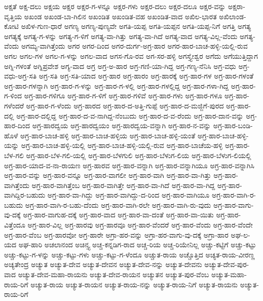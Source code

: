 ಅಕ್ಷತೆ
ಅಕ್ಷ-ದಲು
ಅಕ್ಷಯ
ಅಕ್ಷರ
ಅಕ್ಷರ-ಗ-ಳನ್ನೂ
ಅಕ್ಷರ-ಗಳು
ಅಕ್ಷರ-ದಲು
ಅಕ್ಷರ-ದಲೂ
ಅಕ್ಷರ-ವನ್ನು
ಅಕ್ಷರಾ-ವೃತ್ತಿಯ
ಅಖಂಡ
ಅಖಂಡ-ಬಾ-ಗಿಲಿನ
ಅಖಂಡಿತ
ಅಖಂಡಿತ-ವಹ
ಅಖಂಡಿತ-ವಾದ
ಅಖಿಲ-ಭಾರತ
ಅಖಿಲಾಂಡ-ಕೋಟಿ
ಅಖಿಳ-ಗುಣ-ಧಾರೆ
ಅಗಣ್ಯ
ಅಗಣ್ಯ-ಪುಣ್ಯವೇ
ಅಗತಿ-ಯಪ್ಪ
ಅಗತಿ-ಯಪ್ಪನ
ಅಗತಿ-ಯಪ್ಪ-ನಿಗೆ
ಅಗತ್ತಿ
ಅಗತ್ಯ
ಅಗತ್ಯಕ್ಕೆ
ಅಗತ್ಯ-ಗ-ಳನ್ನು
ಅಗತ್ಯ-ಗ-ಳಿಗೆ
ಅಗತ್ಯ-ವಾ-ಗಿತ್ತು
ಅಗತ್ಯ-ವಾ-ಗಿದೆ
ಅಗತ್ಯ-ವಾದ
ಅಗತ್ಯ-ವಿಲ್ಲ-ವೆಂದು
ಅಗತ್ಯ-ವೆಂದು
ಅಗಮ್ಯ-ವಾಗಿತ್ತೆಂದು
ಅಗರ
ಅಗರ-ದಿಂದ
ಅಗರ-ದುರ್ಗ-ಅಗ್ರ-ಹಾರ
ಅಗರ-ಹಾರ-ಬಾಚ-ಹಳ್ಳಿ-ಯಲ್ಲಿ-ರುವ
ಅಗಲ
ಅಗಲ-ಗಳ
ಅಗಲ-ಗ-ಳನ್ನು
ಅಗಲ-ವಾದ
ಅಗಸ-ಗೊ-ರವ
ಅಗ-ಸರ-ಹಳ್ಳಿ
ಅಗಸ್ತ್ಯೇಶ್ವರ
ಅಗೆದು
ಅಗೆಯುತ್ತಿದ್ದಾಗ
ಅಗ್ನಿ-ಗಳಂತೆ
ಅಗ್ನಿಪ್ರವೇಶ
ಅಗ್ಯ-ವಾದ
ಅಗ್ರ
ಅಗ್ರ-ಅ-ಹಾರ
ಅಗ್ರ-ಗಣಿ-ಯಾ-ಗಿದ್ದ
ಅಗ್ರ-ಗಣ್ಯ-ನೆನಿಸಿ
ಅಗ್ರ-ವಧು
ಅಗ್ರ-ವಧು-ಅಗ್ರ-ಸತಿ
ಅಗ್ರ-ಸತಿ
ಅಗ್ರ-ಸತಿ-ಯಾದ
ಅಗ್ರ-ಹಾರ
ಅಗ್ರ-ಹಾರಂ
ಅಗ್ರ-ಹಾರಕ್ಕೆ
ಅಗ್ರ-ಹಾರ-ಗಳ
ಅಗ್ರ-ಹಾರ-ಗಳಂತೆ
ಅಗ್ರ-ಹಾರ-ಗಳನ್ನಾಗಿ
ಅಗ್ರ-ಹಾರ-ಗ-ಳನ್ನು
ಅಗ್ರ-ಹಾರ-ಗ-ಳಲ್ಲಿ
ಅಗ್ರ-ಹಾರ-ಗಳಲ್ಲಿದ್ದ
ಅಗ್ರ-ಹಾರ-ಗಳಾ-ಗಿದ್ದ
ಅಗ್ರ-ಹಾರ-ಗ-ಳಿಂದ
ಅಗ್ರ-ಹಾರ-ಗಳಿಗೂ
ಅಗ್ರ-ಹಾರ-ಗ-ಳಿಗೆ
ಅಗ್ರ-ಹಾರ-ಗಳಿವೆ
ಅಗ್ರ-ಹಾರ-ಗಳು
ಅಗ್ರ-ಹಾರ-ಗಳೂ
ಅಗ್ರ-ಹಾರ-ಗಳೆಂದರೆ
ಅಗ್ರ-ಹಾರ-ಗ-ಳೆಂದು
ಅಗ್ರ-ಹಾರದ
ಅಗ್ರ-ಹಾರ-ದ-ಅತ್ತಿ-ಗುಪ್ಪೆ
ಅಗ್ರ-ಹಾರ-ದ-ಮಜ್ಜಿಗೆ-ಪುರದ
ಅಗ್ರ-ಹಾರ-ದಲ್ಲಿ
ಅಗ್ರ-ಹಾರ-ದಲ್ಲಿದ್ದ
ಅಗ್ರ-ಹಾರ-ದ-ವ-ನಾಗಿದ್ದ-ನೆಂಬುದು
ಅಗ್ರ-ಹಾರ-ದ-ವ-ರೆಂದು
ಅಗ್ರ-ಹಾರ-ದಾನ-ವನ್ನು
ಅಗ್ರ-ಹಾರ-ದಿಂದ
ಅಗ್ರ-ಹಾರದ್ವಯ
ಅಗ್ರ-ಹಾರದ್ವಯಂ
ಅಗ್ರ-ಹಾರದ್ವಯ-ವನ್ನಾಗಿ
ಅಗ್ರ-ಹಾರ-ನ-ವನ್ನು
ಅಗ್ರ-ಹಾರ-ಬಂಡಿ-ಹೊಳೆ
ಅಗ್ರ-ಹಾರ-ಬಾಚ-ಹಳ್ಳಿ
ಅಗ್ರ-ಹಾರ-ಬಾಚ-ಹಳ್ಳಿಯ
ಅಗ್ರ-ಹಾರ-ಬಾಚ-ಹಳ್ಳಿ-ಯಂತೆ
ಅಗ್ರ-ಹಾರ-ಬಾಚ-ಹಳ್ಳಿ-ಯನ್ನು
ಅಗ್ರ-ಹಾರ-ಬಾಚ-ಹಳ್ಳಿ-ಯಲ್ಲಿ
ಅಗ್ರ-ಹಾರ-ಬಾಚ-ಹಳ್ಳಿ-ಯಲ್ಲಿ-ರುವ
ಅಗ್ರ-ಹಾರ-ಬಾಚೆಯ-ಹಳ್ಳಿ
ಅಗ್ರ-ಹಾರ-ಬೆಳ-ಗಲಿ
ಅಗ್ರ-ಹಾರ-ಬೆಳ-ಗಲಿ-ಯಲ್ಲಿ
ಅಗ್ರ-ಹಾರ-ಬೆಳಗುಲಿ
ಅಗ್ರ-ಹಾರ-ಬೆಳುಗ-ಲಿಯ
ಅಗ್ರ-ಹಾರ-ಬೆಳುಗ-ಲಿಯಲ್ಲಿ
ಅಗ್ರ-ಹಾರ-ಯಾದ-ವ-ನಾ-ರಾಯಣ
ಅಗ್ರ-ಹಾರವ
ಅಗ್ರ-ಹಾರ-ವನ್ನಾಗಿ
ಅಗ್ರ-ಹಾರ-ವನ್ನಾಗಿಯೂ
ಅಗ್ರ-ಹಾರ-ವನ್ನಾಗಿಸಿ
ಅಗ್ರ-ಹಾರ-ವನ್ನು
ಅಗ್ರ-ಹಾರ-ವನ್ನೂ
ಅಗ್ರ-ಹಾರ-ವಾಗಲೀ
ಅಗ್ರ-ಹಾರ-ವಾಗಿ
ಅಗ್ರ-ಹಾರ-ವಾ-ಗಿತ್ತು
ಅಗ್ರ-ಹಾರ-ವಾಗಿತ್ತೆಂದು
ಅಗ್ರ-ಹಾರ-ವಾಗಿತ್ತೆಂಬ
ಅಗ್ರ-ಹಾರ-ವಾಗಿತ್ತೇ
ಅಗ್ರ-ಹಾರ-ವಾ-ಗಿದೆ
ಅಗ್ರ-ಹಾರ-ವಾ-ಗಿದ್ದ
ಅಗ್ರ-ಹಾರ-ವಾಗಿದ್ದಿರ-ಬಹುದು
ಅಗ್ರ-ಹಾರ-ವಾ-ಗಿದ್ದು
ಅಗ್ರ-ಹಾರ-ವಾಗಿದ್ದು-ದ-ರಿಂದ
ಅಗ್ರ-ಹಾರ-ವಾಗಿಯೂ
ಅಗ್ರ-ಹಾರ-ವಾಗಿ-ರ-ಬಹುದು
ಅಗ್ರ-ಹಾರ-ವಾಗಿ-ರ-ಬಹು-ದೆಂದು
ಅಗ್ರ-ಹಾರ-ವಾಗಿ-ರಲೇ
ಅಗ್ರ-ಹಾರ-ವಾಗಿ-ರು-ವುದು
ಅಗ್ರ-ಹಾರ-ವಾಗು-ವು-ದಕ್ಕೆ
ಅಗ್ರ-ಹಾರ-ವಾಗುಹ-ದಕ್ಕೆ
ಅಗ್ರ-ಹಾರ-ವಾದ
ಅಗ್ರ-ಹಾರ-ವಾ-ದಂತೆ
ಅಗ್ರ-ಹಾರ-ವಾ-ಯಿತು
ಅಗ್ರ-ಹಾರ-ವಿತ್ತೆಂದೂ
ಅಗ್ರ-ಹಾರ-ವಿಲ್ಲ
ಅಗ್ರ-ಹಾರವು
ಅಗ್ರ-ಹಾರವೂ
ಅಗ್ರ-ಹಾರ-ವೆಂದರೆ
ಅಗ್ರ-ಹಾರ-ವೆಂದು
ಅಗ್ರ-ಹಾರ-ವೆಂದೇ
ಅಗ್ರ-ಹಾರ-ವೆಂಬ
ಅಗ್ರ-ಹಾರವೋ
ಅಗ್ರ-ಹಾರೇ
ಅಗ್ರಾ-ಹರ-ವನ್ನು
ಅಗ್ರಾ-ಹರ-ವಾಗು-ವು-ದಕ್ಕೆ
ಅಗ್ರಾ-ಹಾರ
ಅಘ-ಲ-ಯದ
ಅಘ-ಹಾರಿ
ಅಚಲಾನಂದ
ಅಚಿನ್ತ್ಯ
ಅಚ್ಚ-ಕನ್ನಡಿಗ-ರಾದ
ಅಚ್ಚ-ರಿಯ
ಅಚ್ಚ-ರಿಯೇನಿಲ್ಲ
ಅಚ್ಚು-ಕಟ್ಟಿಗೆ
ಅಚ್ಚು-ಕಟ್ಟು
ಅಚ್ಚು-ಕಟ್ಟು-ಗ-ಳನ್ನು
ಅಚ್ಚು-ಕಟ್ಟು-ಗಳು
ಅಚ್ಚು-ಕಟ್ಟು-ಗ-ಳೆಂದೂ
ಅಚ್ಚುತ-ರಾಯ
ಅಚ್ಚೊತ್ತಿದ
ಅಚ್ಯತ-ರಾಯ-ವೀರಣ್ಣ
ಅಚ್ಯತೇಂದ್ರ
ಅಚ್ಯುತ
ಅಚ್ಯುತ-ದೇವ
ಅಚ್ಯುತ-ದೇವನ
ಅಚ್ಯುತ-ದೇವ-ನನ್ನು
ಅಚ್ಯುತ-ದೇವನು
ಅಚ್ಯುತ-ದೇವ-ಪುರ-ವಾದ
ಅಚ್ಯುತ-ದೇವ-ಮಹಾ-ರಾಯನು
ಅಚ್ಯುತ-ದೇವ-ರಾಯನ
ಅಚ್ಯುತನ
ಅಚ್ಯುತ-ಪುರ-ವೆಂಬ
ಅಚ್ಯುತ-ಮಹಾ-ರಾಯ-ರಿಗೆ
ಅಚ್ಯುತ-ರಾಯ
ಅಚ್ಯುತ-ರಾಯನ
ಅಚ್ಯುತ-ರಾಯ-ನನ್ನು
ಅಚ್ಯುತ-ರಾಯ-ನಿಗೆ
ಅಚ್ಯುತ-ರಾಯನು
ಅಚ್ಯುತ-ರಾಯ-ರಿಗೆ
